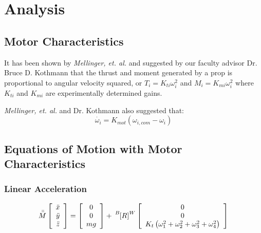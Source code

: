 \documentclass{article}
\numberwithin{equation}{section}
\newcommand{\BtoW}{
\tensor[^B]{\left[R\right]}{^W}
}
\begin{document}
\section{Analysis}
\subsection{Motor Characteristics}
It has been shown by \emph{Mellinger, et. al.} and suggested by our faculty advisor Dr. Bruce D. Kothmann that the thrust and moment generated by a prop is proportional to angular velocity squared, or $T_i = K_{ti} \omega_i^2$ and $M_i = K_{mi} \omega_i^2$ where $K_{ti}$ and $K_{mi}$ are experimentally determined gains.

\emph{Mellinger, et. al.} and Dr. Kothmann also suggested that:
\[\dot{\omega_i} = K_{mot}\left(\omega_{i,com} - \omega_i\right)\]

\subsection{Equations of Motion with Motor Characteristics}
\subsubsection{Linear Acceleration}
\begin{equation}
    \label{linAccelMot}
     \bar{\bar{M}} \left[ \begin{array}{ccc} 
           \ddot{x} \\ 
           \ddot{y} \\ 
           \ddot{z} \end{array} \right] 
           =
   \left[ \begin{array}{ccc}
          0 \\
          0 \\
          mg \end{array} \right]
          +
    \BtoW \left[\begin{array}{ccc}
         0 \\
         0 \\
         K_t\left(\omega_1^2 + \omega_2^2 + \omega_3^2 + \omega_4^2\right)
         \end{array}\right]
\end{equation}
\end{document}
